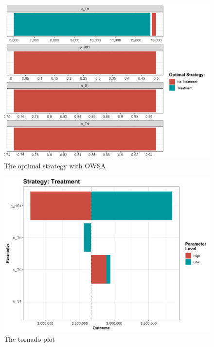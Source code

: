 \documentclass[]{book}
\begin{document}
\begin{figure}

{\centering \includegraphics[width=1\linewidth]{../figs/05b_optimal_owsa_nmb} 

}

\caption{The optimal strategy with OWSA}\label{fig:05b-optimal-owsa-nmb}
\end{figure}

\begin{figure}

{\centering \includegraphics[width=1\linewidth]{../figs/05b_tornado_Treatment_nmb} 

}

\caption{The tornado plot}\label{fig:05b-tornado-Treatment-nmb}
\end{figure}
\end{document}
